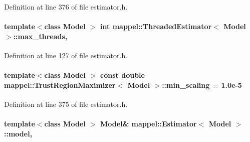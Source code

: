 Definition at line 376 of file estimator.\+h.

\paragraph[{\texorpdfstring{max\+\_\+threads}{max_threads}}]{\setlength{\rightskip}{0pt plus 5cm}template$<$class Model $>$ int {\bf mappel\+::\+Threaded\+Estimator}$<$ Model $>$\+::max\+\_\+threads\hspace{0.3cm}{\ttfamily [protected]}, {\ttfamily [inherited]}}\hypertarget{classmappel_1_1ThreadedEstimator_a31391f8aaab3484f58bfdedbdb22be42}{}\label{classmappel_1_1ThreadedEstimator_a31391f8aaab3484f58bfdedbdb22be42}


Definition at line 127 of file estimator.\+h.

\paragraph[{\texorpdfstring{min\+\_\+scaling}{min_scaling}}]{\setlength{\rightskip}{0pt plus 5cm}template$<$class Model $>$ const double {\bf mappel\+::\+Trust\+Region\+Maximizer}$<$ Model $>$\+::min\+\_\+scaling = 1.\+0e-\/5\hspace{0.3cm}{\ttfamily [static]}}\hypertarget{classmappel_1_1TrustRegionMaximizer_abf5fc9992128173691438a92772236b5}{}\label{classmappel_1_1TrustRegionMaximizer_abf5fc9992128173691438a92772236b5}


Definition at line 375 of file estimator.\+h.

\paragraph[{\texorpdfstring{model}{model}}]{\setlength{\rightskip}{0pt plus 5cm}template$<$class Model $>$ Model\& {\bf mappel\+::\+Estimator}$<$ Model $>$\+::model\hspace{0.3cm}{\ttfamily [protected]}, {\ttfamily [inherited]}}\hypertarget{classmappel_1_1Estimator_a8322546d87ccdf01f8b0dcd9dae509f0}{}\label{classmappel_1_1Estimator_a8322546d87ccdf01f8b0dcd9dae509f0}


